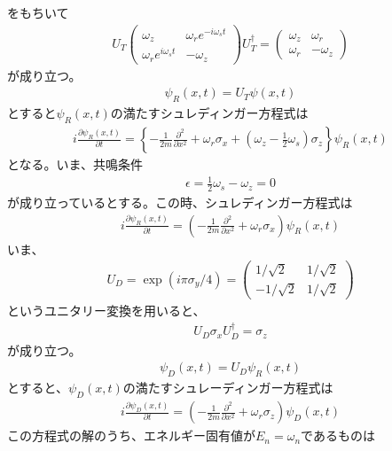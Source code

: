 をもちいて
\begin{align}
U_{T}\begin{pmatrix}
\omega_{z} &\omega_{r}e^{-i\omega_{s}t} \\
\omega_{r}e^{i\omega_{s}t} &-\omega_{z}
\end{pmatrix}U_{T}^{\dagger}=
\begin{pmatrix}
\omega_{z} &\omega_{r} \\
\omega_{r} &-\omega_{z}
\end{pmatrix}
\end{align}
が成り立つ。
\begin{align}
{\psi}_{R}(x,t)=U_{T}{\psi}(x,t)
\end{align}
とすると${\psi}_{R}(x,t)$の満たすシュレディンガー方程式は
\begin{align}
i\frac{\partial {\psi}_{R}(x,t)}{\partial t}=\left\{-\frac{1}{2m}\frac{\partial^2}{\partial x^2}+\omega_{r}{\sigma}_{x}+\left(\omega_{z}-\frac{1}{2}\omega_{s}\right){\sigma}_{z}\right\}{\psi}_{R}(x,t)
\end{align}
となる。いま、共鳴条件
\begin{align}
{\epsilon}=\frac{1}{2}\omega_{s}-\omega_{z}=0
\end{align}
が成り立っているとする。この時、シュレディンガー方程式は
\begin{align}
i\frac{\partial {\psi}_{R}(x,t)}{\partial t}=\left(-\frac{1}{2m}\frac{\partial^2}{\partial x^2}+\omega_{r}{\sigma}_{x}\right){\psi}_{R}(x,t)
\end{align}
いま、
\begin{align}
U_{D}=\exp(i{\pi}{\sigma}_{y}/4)=
\begin{pmatrix}
1/\sqrt{2} &1/\sqrt{2} \\
-1/\sqrt{2} &1/\sqrt{2}
\end{pmatrix}
\end{align}
というユニタリー変換を用いると、
\begin{align}
U_{D}{\sigma}_{x}U_{D}^{\dagger}={\sigma}_{z}
\end{align}
が成り立つ。
\begin{align}
{\psi}_{D}(x,t)=U_{D}{\psi}_{R}(x,t)
\end{align}
とすると、${\psi}_{D}(x,t)$の満たすシュレーディンガー方程式は
\begin{align}
i\frac{\partial {\psi}_{D}(x,t)}{\partial t}=\left(-\frac{1}{2m}\frac{\partial^2}{\partial x^2}+\omega_{r}{\sigma}_{z}\right){\psi}_{D}(x,t)
\end{align}
この方程式の解のうち、エネルギー固有値が$E_{n}=\omega_{n}$であるものは
